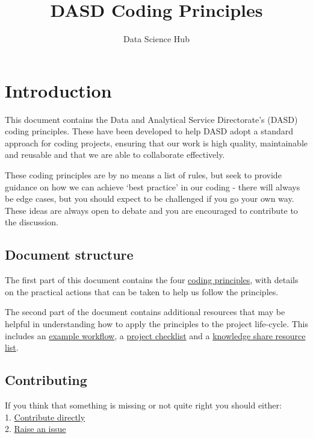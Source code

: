 \documentclass[]{book}
\title{DASD Coding Principles}
\author{Data Science Hub}
\date{}
\begin{document}
\maketitle

{
\setcounter{tocdepth}{1}
\tableofcontents
}
\hypertarget{intro}{%
\chapter*{Introduction}\label{intro}}

This document contains the Data and Analytical Service Directorate's (DASD) coding principles. These have been developed to help DASD adopt a standard approach for coding projects, ensuring that our work is high quality, maintainable and reusable and that we are able to collaborate effectively.

These coding principles are by no means a list of rules, but seek to provide guidance on how we can achieve `best practice' in our coding - there will always be edge cases, but you should expect to be challenged if you go your own way. These ideas are always open to debate and you are encouraged to contribute to the discussion.

\hypertarget{structure}{%
\section*{Document structure}\label{structure}}

The first part of this document contains the four \protect\hyperlink{principles}{coding principles}, with details on the practical actions that can be taken to help us follow the principles.

The second part of the document contains additional resources that may be helpful in understanding how to apply the principles to the project life-cycle. This includes an \protect\hyperlink{wf}{example workflow}, a \protect\hyperlink{checklist}{project checklist} and a \protect\hyperlink{ksresources}{knowledge share resource list}.

\hypertarget{contributing}{%
\section*{Contributing}\label{contributing}}

If you think that something is missing or not quite right you should either:\\
1. \protect\hyperlink{versioncontrol}{Contribute directly}\\
2. \href{https://github.com/moj-analytical-services/our-coding-standards/issues}{Raise an issue}
\end{document}
